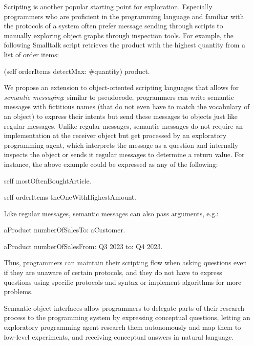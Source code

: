 Scripting is another popular starting point for exploration.
Especially programmers who are proficient in the programming language and familiar with the protocols of a system often prefer message sending through scripts to manually exploring object graphs through inspection tools.
For example, the following Smalltalk script retrieves the product with the highest quantity from a list of order items:

\begin{multicode}
	(self orderItems detectMax: \#quantity) product.
\end{multicode}

We propose an extension to object-oriented scripting languages that allows for \emph{semantic messaging}: similar to pseudocode, programmers can write semantic messages with fictitious names (that do not even have to match the vocabulary of an object) to express their intents but send these messages to objects just like regular messages.
Unlike regular messages, semantic messages do not require an implementation at the receiver object but get processed by an exploratory programming agent, which interprets the message as a question and internally inspects the object or sends it regular messages to determine a return value.
For instance, the above example could be expressed as any of the following:
\begin{multicode}
	self mostOftenBoughtArticle.

	self orderItems theOneWithHighestAmount.
\end{multicode}
Like regular messages, semantic messages can also pass arguments, e.g.:
\begin{multicode}
	aProduct numberOfSalesTo: aCustomer.

	aProduct numberOfSalesFrom: \textquotesingle Q3 2023\textquotesingle{} to: \textquotesingle Q4 2023\textquotesingle.
\end{multicode}

\noindent
Thus, programmers can maintain their scripting flow when asking questions even if they are unaware of certain protocols, and they do not have to express questions using specific protocols and syntax or implement algorithms for more problems.

\ParSep

Semantic object interfaces allow programmers to delegate parts of their research process to the programming system by expressing conceptual questions, letting an exploratory programming agent research them autonomously and map them to low-level experiments, and receiving conceptual answers in natural language.
